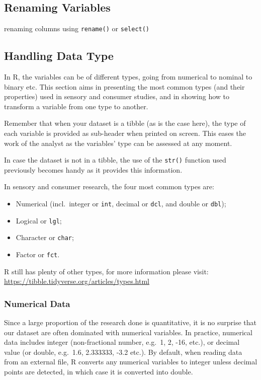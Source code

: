 \documentclass[
]{book}
\providecommand{\tightlist}{%
  \setlength{\itemsep}{0pt}\setlength{\parskip}{0pt}}
\begin{document}
\hypertarget{renaming-variables-1}{%
\subsection{Renaming Variables}\label{renaming-variables-1}}

renaming columns using \texttt{rename()} or \texttt{select()}

\hypertarget{handling-data-type}{%
\subsection{Handling Data Type}\label{handling-data-type}}

In R, the variables can be of different types, going from numerical to nominal to binary etc. This section aims in presenting the most common types (and their properties) used in sensory and consumer studies, and in showing how to transform a variable from one type to another.

Remember that when your dataset is a tibble (as is the case here), the type of each variable is provided as sub-header when printed on screen. This eases the work of the analyst as the variables' type can be assessed at any moment.

In case the dataset is not in a tibble, the use of the \texttt{str()} function used previously becomes handy as it provides this information.

In sensory and consumer research, the four most common types are:

\begin{itemize}
\tightlist
\item
  Numerical (incl.~integer or \texttt{int}, decimal or \texttt{dcl}, and double or \texttt{dbl});
\item
  Logical or \texttt{lgl};
\item
  Character or \texttt{char};
\item
  Factor or \texttt{fct}.
\end{itemize}

R still has plenty of other types, for more information please visit: \url{https://tibble.tidyverse.org/articles/types.html}

\hypertarget{numerical-data}{%
\subsubsection{Numerical Data}\label{numerical-data}}

Since a large proportion of the research done is quantitative, it is no surprise that our dataset are often dominated with numerical variables. In practice, numerical data includes integer (non-fractional number, e.g.~1, 2, -16, etc.), or decimal value (or double, e.g.~1.6, 2.333333, -3.2 etc.).
By default, when reading data from an external file, R converts any numerical variables to integer unless decimal points are detected, in which case it is converted into double.
\end{document}
